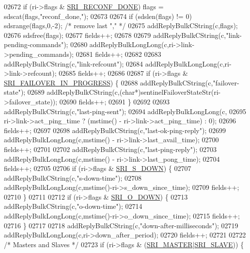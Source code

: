 \begin{DoxyCode}
{{{{{{{{{{{{{{{{{{{{{{{{{{{{{{{{{{{{{{{{{{{{{{{{{{{{{{{{{02672     \textcolor{keywordflow}{if} (ri->flags & \hyperlink{sentinel_8c_adb468d0a8c96c954b6af26aa670d7a11}{SRI\_RECONF\_DONE}) flags = sdscat(flags,\textcolor{stringliteral}{"reconf\_done,"});
02673 
02674     \textcolor{keywordflow}{if} (sdslen(flags) != 0) sdsrange(flags,0,-2); \textcolor{comment}{/* remove last "," */}
02675     addReplyBulkCString(c,flags);
02676     sdsfree(flags);
02677     fields++;
02678 
02679     addReplyBulkCString(c,\textcolor{stringliteral}{"link-pending-commands"});
02680     addReplyBulkLongLong(c,ri->link->pending\_commands);
02681     fields++;
02682 
02683     addReplyBulkCString(c,\textcolor{stringliteral}{"link-refcount"});
02684     addReplyBulkLongLong(c,ri->link->refcount);
02685     fields++;
02686 
02687     \textcolor{keywordflow}{if} (ri->flags & \hyperlink{sentinel_8c_a0546b63633196f09fcd90957243b0798}{SRI\_FAILOVER\_IN\_PROGRESS}) \{
02688         addReplyBulkCString(c,\textcolor{stringliteral}{"failover-state"});
02689         addReplyBulkCString(c,(\textcolor{keywordtype}{char}*)sentinelFailoverStateStr(ri->failover\_state));
02690         fields++;
02691     \}
02692 
02693     addReplyBulkCString(c,\textcolor{stringliteral}{"last-ping-sent"});
02694     addReplyBulkLongLong(c,
02695         ri->link->act\_ping\_time ? (mstime() - ri->link->act\_ping\_time) : 0);
02696     fields++;
02697 
02698     addReplyBulkCString(c,\textcolor{stringliteral}{"last-ok-ping-reply"});
02699     addReplyBulkLongLong(c,mstime() - ri->link->last\_avail\_time);
02700     fields++;
02701 
02702     addReplyBulkCString(c,\textcolor{stringliteral}{"last-ping-reply"});
02703     addReplyBulkLongLong(c,mstime() - ri->link->last\_pong\_time);
02704     fields++;
02705 
02706     \textcolor{keywordflow}{if} (ri->flags & \hyperlink{sentinel_8c_a8e26596c8bde451c2dd9cecb2c3046d4}{SRI\_S\_DOWN}) \{
02707         addReplyBulkCString(c,\textcolor{stringliteral}{"s-down-time"});
02708         addReplyBulkLongLong(c,mstime()-ri->s\_down\_since\_time);
02709         fields++;
02710     \}
02711 
02712     \textcolor{keywordflow}{if} (ri->flags & \hyperlink{sentinel_8c_a3bbbca05543cd9d9f86d276e2c7c719c}{SRI\_O\_DOWN}) \{
02713         addReplyBulkCString(c,\textcolor{stringliteral}{"o-down-time"});
02714         addReplyBulkLongLong(c,mstime()-ri->o\_down\_since\_time);
02715         fields++;
02716     \}
02717 
02718     addReplyBulkCString(c,\textcolor{stringliteral}{"down-after-milliseconds"});
02719     addReplyBulkLongLong(c,ri->down\_after\_period);
02720     fields++;
02721 
02722     \textcolor{comment}{/* Masters and Slaves */}
02723     \textcolor{keywordflow}{if} (ri->flags & (\hyperlink{sentinel_8c_a2ee83e5ff67b45746cd6a310f15334b2}{SRI\_MASTER}|\hyperlink{sentinel_8c_a4b9db21eda79d49bd9fdf2cf7b3178e8}{SRI\_SLAVE})) \{
}}}}}}}}}}}}}}}}}}}}}}}}}}}}}}}}}}}}}}}}}}}}}}}}}}}}}}}}}
\end{DoxyCode}
